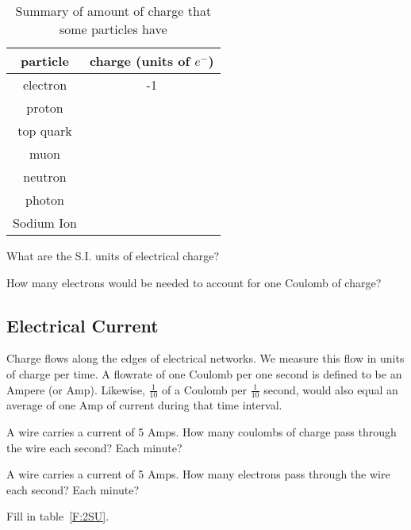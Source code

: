 \par
\begin{table}[H]
\begin{center}
\begin{tabular}{|c|c|} \hline
particle	&	charge (units of $e^-$) \\ \hline
electron	&	-1\\ \hline
proton		&	\\ \hline
top quark	&	\\ \hline
muon		&	\\ \hline
neutron		&	\\ \hline
photon		&	\\ \hline
Sodium Ion	&	\\ \hline
\end{tabular}
\caption{Summary of amount of charge that some particles have}
\label{T:2EP}
\end{center}
\end{table}

\begin{alevel}
What are the S.I. units of electrical charge?
\end{alevel}

\begin{blevel}
How many electrons would be needed to account for one Coulomb of charge?
\end{blevel}

\subsection{Electrical Current}
Charge flows along the edges of electrical networks. We measure this flow in units of charge per time. A flowrate of one Coulomb per one second is defined to be an Ampere (or Amp). Likewise, $\frac{1}{10}$ of a Coulomb per $\frac{1}{10}$ second, would also equal an average of one Amp of current during that time interval.
\par
\begin{alevel}
A wire carries a current of 5 Amps. How many coulombs of charge pass through the wire each second? Each minute?
\end{alevel}

\begin{blevel}
A wire carries a current of 5 Amps. How many electrons pass through the wire each second? Each minute?
\end{blevel}

\begin{blevel}
Fill in table~\ref{F:2SU}.
\end{blevel}

